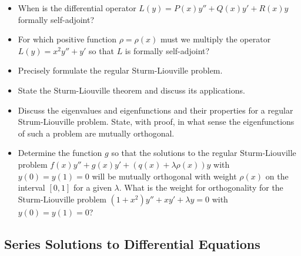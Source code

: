\begin{itemize}

	\item When is the differential operator $ L(y) = P(x)y'' + Q(x) y' + R(x) y $ formally self-adjoint?
	
	\item For which positive function $ \rho = \rho(x) $ must we multiply the operator $ L(y) = x^{2}y'' + y' $ so that $ L $ is formally self-adjoint?

	\item Precisely formulate the regular Sturm-Liouville problem. 
	
	\item State the Sturm-Liouville theorem and discuss its applications.
	
	\item Discuss the eigenvalues and eigenfunctions and their properties for a regular Strum-Liouville problem. State, with proof, in what sense the eigenfunctions of such a problem are mutually orthogonal.
	
	\item Determine the function $ g $ so that the solutions to the regular Sturm-Liouville problem $ f(x)y'' + g(x)y' + (q(x) + \lambda \rho (x))y $  with $ y(0) = y(1) = 0 $ will be mutually orthogonal with weight $ \rho(x) $ on the interval $ [0, 1] $ for a given $ \lambda $.
	What is the weight for orthogonality for the Sturm-Liouville problem $ (1 + x^2)y'' + xy' + \lambda y = 0 $ with $ y(0) = y(1) = 0 $?

\end{itemize}


\subsection{Series Solutions to Differential Equations}

